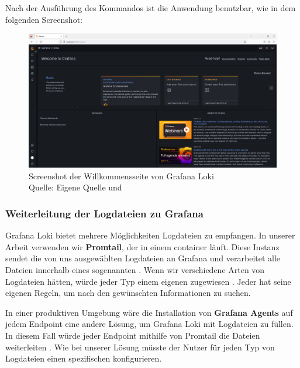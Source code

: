 \newpage
{} 
\thispagestyle{lscape}
\begin{landscape}
   Nach der Ausführung des Kommandos ist die Anwendung benutzbar, wie in dem folgenden Screenshot:
    \begin{figure}[H]
        \centerline{\includegraphics[width=1.5\textwidth]{assets/Installation_Grafana.png}}
        \caption[Screenshot der Willkommensseite von Grafana Loki]
        {Screenshot der Willkommensseite von Grafana Loki\\Quelle: Eigene Quelle und \citep{Grafana_Logs}}
        \centering
    \end{figure} 
\end{landscape}
\restoregeometry  

\subsubsection{Weiterleitung der Logdateien zu Grafana}
Grafana Loki bietet mehrere Möglichkeiten Logdateien zu empfangen. In unserer Arbeit verwenden wir \textbf{Promtail}, der in einem \gls{container} läuft. Diese Instanz sendet die von uns ausgewählten Logdateien an Grafana und verarbeitet alle Dateien innerhalb eines sogenannten . Wenn wir verschiedene Arten von Logdateien hätten, würde jeder Typ einem eigenen  zugewiesen \citep{Grafana_CollectLogs}. Jeder  hat seine eigenen Regeln, um nach den gewünschten Informationen zu suchen.

In einer produktiven Umgebung wäre die Installation von \textbf{Grafana Agents} auf jedem \gls{Endpoint} eine andere Lösung, um Grafana Loki mit Logdateien zu füllen. In diesem Fall würde jeder \gls{Endpoint} mithilfe von Promtail die Dateien weiterleiten \citep{Grafana_Agents}. Wie bei unserer Lösung müsste der Nutzer für jeden Typ von Logdateien einen spezifischen  konfigurieren.

